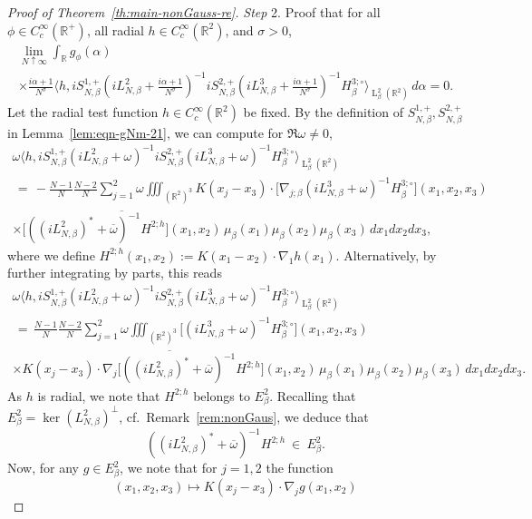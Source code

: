 \documentclass[a4paper,11pt,reqno,noindent]{amsart}
\theoremstyle{plain}
\numberwithin{equation}{section}
\newcommand{\R}{\mathbb R}
\newcommand{\3}{|\!|\!|}
\newcommand{\Ld}{\operatorname{L}}
\newcommand{\step}[1]{\noindent \textit{Step} #1.}
\begin{document}
\begin{proof}[Proof of Theorem~\ref{th:main-nonGauss-re}]
\medskip
\step2 Proof that for all $\phi\in C^\infty_c(\R^+)$, all radial $h\in C^\infty_c(\R^2)$, and $\sigma>0$,
\begin{multline}\label{eq:cancel-term}
\lim_{N\uparrow\infty}\int_\R g_\phi(\alpha)\\
\times\tfrac{i\alpha+1}{N^\sigma}\Big\langle h,iS_{N,\beta}^{1,+}(iL_{N,\beta}^2+\tfrac{i\alpha+1}{N^\sigma})^{-1}iS_{N,\beta}^{2,+}(iL_{N,\beta}^3+\tfrac{i\alpha+1}{N^\sigma})^{-1}H_\beta^{3;\circ}\Big\rangle_{\Ld^2_\beta(\R^2)}\,d\alpha
=0.
\end{multline}
Let the radial test function $h\in C^\infty_c(\R^2)$ be fixed.
By the definition of $S_{N,\beta}^{1,+},S_{N,\beta}^{2,+}$ in Lemma~\ref{lem:eqn-gNm-21}, we can compute for $\Re\omega\ne0$,
\begin{multline}\label{eq:decomp-omexpr-0}
\omega \Big\langle h,iS_{N,\beta}^{1,+}(iL_{N,\beta}^2+\omega)^{-1}iS_{N,\beta}^{2,+}(iL_{N,\beta}^3+\omega)^{-1}H_\beta^{3;\circ}\Big\rangle_{\Ld^2_\beta(\R^2)}\\
\,=\,-\tfrac{N-1}N\tfrac{N-2}N\sum_{j=1}^2\omega\iiint_{(\R^2)^3} K(x_j-x_3)\cdot\big[\nabla_{j;\beta}(iL_{N,\beta}^3+\omega)^{-1}H_\beta^{3;\circ}\big](x_1,x_2,x_3)\\
\times \overline{\big[((iL_{N,\beta}^2)^*+\overline\omega)^{-1}H^{2;h}\big](x_1,x_2)}\,\mu_\beta(x_1)\mu_\beta(x_2)\mu_\beta(x_3)\,dx_1dx_2dx_3,
\end{multline}
where we define $H^{2;h}(x_1,x_2):= K(x_1-x_2)\cdot \nabla_1h(x_1)$.
Alternatively, by further integrating by parts, this reads
\begin{multline*}
\omega \Big\langle h,iS_{N,\beta}^{1,+}(iL_{N,\beta}^2+\omega)^{-1}iS_{N,\beta}^{2,+}(iL_{N,\beta}^3+\omega)^{-1}H_\beta^{3;\circ}\Big\rangle_{\Ld^2_\beta(\R^2)}\\
\,=\,\tfrac{N-1}N\tfrac{N-2}N\sum_{j=1}^2\omega\iiint_{(\R^2)^3} \big[(iL_{N,\beta}^3+\omega)^{-1}H_\beta^{3;\circ}\big](x_1,x_2,x_3)\\
\times \overline{K(x_j-x_3)\cdot\nabla_{j}\big[((iL_{N,\beta}^2)^*+\overline\omega)^{-1}H^{2;h}\big](x_1,x_2)}\,\mu_\beta(x_1)\mu_\beta(x_2)\mu_\beta(x_3)\,dx_1dx_2dx_3.
\end{multline*}
As $h$ is radial, we note that $H^{2;h}$ belongs to $E^2_\beta$.
Recalling that $E^2_\beta=\ker(L_{N,\beta}^2)^\bot$, cf.~Remark~\ref{rem:nonGaus}, we deduce that
\[((iL_{N,\beta}^2)^*+\overline\omega)^{-1}H^{2;h}~\in~E^2_\beta.\]
Now, for any $g\in E^2_\beta$, we note that for $j=1,2$ the function
\[(x_1,x_2,x_3)\mapsto K(x_j-x_3)\cdot\nabla_jg(x_1,x_2)\]

\end{proof}
\end{document}
